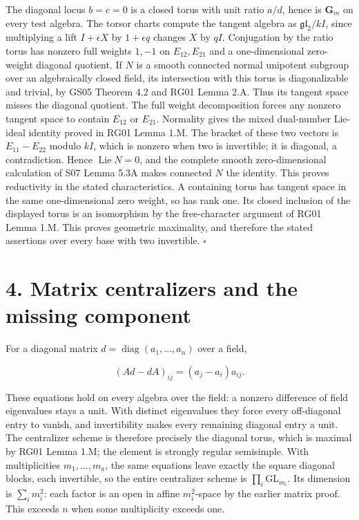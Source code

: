\documentclass[11pt,a4paper,openany]{report}
\begin{document}
The diagonal locus \(b=c=0\) is a closed torus with unit ratio \(a/d\), hence is \(\mathbf G_m\) on every test algebra. The torsor charts compute the tangent algebra as \(\mathfrak{gl}_2/kI\), since multiplying a lift \(I+\epsilon X\) by \(1+\epsilon q\) changes \(X\) by \(qI\). Conjugation by the ratio torus has nonzero full weights \(1,-1\) on \(E_{12},E_{21}\) and a one-dimensional zero-weight diagonal quotient. If \(N\) is a smooth connected normal unipotent subgroup over an algebraically closed field, its intersection with this torus is diagonalizable and trivial, by GS05 Theorem 4.2 and RG01 Lemma 2.A. Thus its tangent space misses the diagonal quotient. The full weight decomposition forces any nonzero tangent space to contain \(E_{12}\) or \(E_{21}\). Normality gives the mixed dual-number Lie-ideal identity proved in RG01 Lemma 1.M. The bracket of these two vectors is \(E_{11}-E_{22}\) modulo \(kI\), which is nonzero when two is invertible; it is diagonal, a contradiction. Hence \(\operatorname{Lie}N=0\), and the complete smooth zero-dimensional calculation of S07 Lemma 5.3A makes connected \(N\) the identity. This proves reductivity in the stated characteristics. A containing torus has tangent space in the same one-dimensional zero weight, so has rank one. Its closed inclusion of the displayed torus is an isomorphism by the free-character argument of RG01 Lemma 1.M. This proves geometric maximality, and therefore the stated assertions over every base with two invertible. \(\square\)

\section{4. Matrix centralizers and the missing component}\label{AG-RG-02-matrix-centralizers-and-the-missing-component}

For a diagonal matrix \(d=\operatorname{diag}(a_1,\ldots,a_n)\) over a field,

\[
(Ad-dA)_{ij}=(a_j-a_i)a_{ij}.
\]

These equations hold on every algebra over the field: a nonzero difference of field eigenvalues stays a unit. With distinct eigenvalues they force every off-diagonal entry to vanish, and invertibility makes every remaining diagonal entry a unit. The centralizer scheme is therefore precisely the diagonal torus, which is maximal by RG01 Lemma 1.M; the element is strongly regular semisimple. With multiplicities \(m_1,\ldots,m_a\), the same equations leave exactly the square diagonal blocks, each invertible, so the entire centralizer scheme is \(\prod_i\mathrm{GL}_{m_i}\). Its dimension is \(\sum_i m_i^2\): each factor is an open in affine \(m_i^2\)-space by the earlier matrix proof. This exceeds \(n\) when some multiplicity exceeds one.
\end{document}
